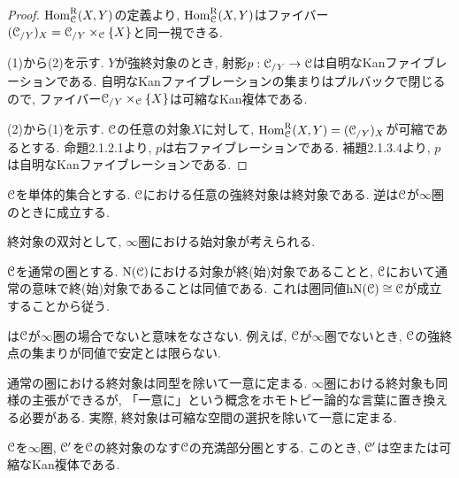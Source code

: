 \documentclass[uplatex, a4paper, 14Q, dvipdfmx]{jsreport}
\begin{document}
\begin{proof} 
  $\mathrm{Hom}^{\mathrm{R}}_{\mathcal{C}}(X,Y)$の定義より, $\mathrm{Hom}^{\mathrm{R}}_{\mathcal{C}}(X,Y)$はファイバー$(\mathcal{C}_{/ Y})_X = \mathcal{C}_{/ Y} \times_{\mathcal{C}} \{X\}$と同一視できる. 

  (1)から(2)を示す. 
  $Y$が強終対象のとき, 射影$p : \mathcal{C}_{/ Y} \to \mathcal{C}$は自明なKanファイブレーションである. 
  自明なKanファイブレーションの集まりはプルバックで閉じるので, ファイバー$\mathcal{C}_{/ Y} \times_{\mathcal{C}} \{X\}$は可縮なKan複体である. 

  (2)から(1)を示す. 
  $\mathcal{C}$の任意の対象$X$に対して, $\mathrm{Hom}^{\mathrm{R}}_{\mathcal{C}}(X,Y) = (\mathcal{C}_{/ Y})_X$が可縮であるとする. 
  命題2.1.2.1より, $p$は右ファイブレーションである. 
  補題2.1.3.4より, $p$は自明なKanファイブレーションである. 
\end{proof}

\begin{corollary} \label{cor.1.2.12.5}
  $\mathcal{C}$を単体的集合とする. 
  $\mathcal{C}$における任意の強終対象は終対象である. 
  逆は$\mathcal{C}$が$\infty$圏のときに成立する.
\end{corollary}

\begin{remark} \label{rem.1.2.12.6}
  終対象の双対として, $\infty$圏における始対象が考えられる.
\end{remark}

\begin{example} \label{eg.1.2.12.7}
  $\mathcal{C}$を通常の圏とする. 
  $\mathrm{N}(\mathcal{C})$における対象が終(始)対象であることと, $\mathcal{C}$において通常の意味で終(始)対象であることは同値である. 
  これは圏同値$\mathrm{h}\mathrm{N}(\mathcal{C}) \cong \mathcal{C}$が成立することから従う. 
\end{example}

\begin{remark} \label{rem.1.2.12.8}
  は$\mathcal{C}$が$\infty$圏の場合でないと意味をなさない. 
  例えば, $\mathcal{C}$が$\infty$圏でないとき, $\mathcal{C}$の強終点の集まりが同値で安定とは限らない.
\end{remark}

通常の圏における終対象は同型を除いて一意に定まる. 
$\infty$圏における終対象も同様の主張ができるが, 「一意に」という概念をホモトピー論的な言葉に置き換える必要がある. 
実際, 終対象は可縮な空間の選択を除いて一意に定まる. 

\begin{proposition}[Joyal] \label{prop.1.2.12.9}
  $\mathcal{C}$を$\infty$圏, $\mathcal{C}'$を$\mathcal{C}$の終対象のなす$\mathcal{C}$の充満部分圏とする. 
  このとき, $\mathcal{C}'$は空または可縮なKan複体である.  
\end{proposition}
\end{document}
